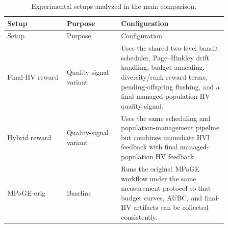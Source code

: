 \begingroup
\renewcommand{\arraystretch}{1.12}
\begin{longtable}{>{\raggedright\arraybackslash}p{0.24\linewidth}>{\raggedright\arraybackslash}p{0.22\linewidth}>{\raggedright\arraybackslash}p{0.43\linewidth}}
\caption[Experimental setup definitions]{Experimental setups analyzed in the main comparison.}
\label{tab:experiment-setups}\\
\toprule
Setup & Purpose & Configuration \\
\midrule
\endfirsthead
\toprule
Setup & Purpose & Configuration \\
\midrule
\endhead
Final-HV reward & Quality-signal variant & Uses the shared two-level bandit scheduler, Page--Hinkley drift handling, budget annealing, diversity/rank reward terms, pending-offspring flushing, and a final managed-population HV quality signal. \\
Hybrid reward & Quality-signal variant & Uses the same scheduling and population-management pipeline but combines immediate HVI feedback with final managed-population HV feedback. \\
MPaGE-orig & Baseline & Runs the original MPaGE workflow under the same measurement protocol so that budget curves, AUBC, and final-HV artifacts can be collected consistently. \\
\bottomrule
\end{longtable}
\endgroup
